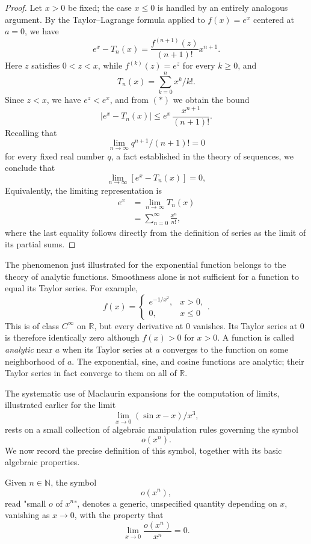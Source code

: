 \begin{proof}
Let $x > 0$ be fixed; the case $x \leq 0$ is handled by an entirely analogous argument. By the Taylor--Lagrange formula applied to $f(x) = e^x$ centered at $a = 0$, we have
\begin{equation*}
e^x - T_n(x) = \frac{f^{(n+1)}(z)}{(n+1)!} x^{n+1}. \tag{$*$}
\end{equation*}
Here $z$ satisfies $0 < z < x$, while $f^{(k)}(z) = e^z$ for every $k \geq 0$, and
\[
T_n(x) = \sum_{k=0}^{n} x^k / k!.
\]
Since $z < x$, we have $e^z < e^x$, and from $(*)$ we obtain the bound
\[
|e^x - T_n(x)| \leq e^x \, \frac{x^{n+1}}{(n+1)!}.
\]
Recalling that \[
\lim_{n \to \infty} q^{n+1}/(n+1)! = 0
\] for every fixed real number $q$, a fact established in the theory of sequences, we conclude that
\[
\lim_{n \to \infty} [e^x - T_n(x)] = 0,
\]
Equivalently, the limiting representation is
\[
\begin{aligned}
e^x &= \lim_{n \to \infty} T_n(x) \\
&= \sum_{n=0}^{\infty} \frac{x^n}{n!},
\end{aligned}
\]
where the last equality follows directly from the definition of series as the limit of its partial sums.
\end{proof}

The phenomenon just illustrated for the exponential function belongs to
the theory of analytic functions. Smoothness alone is not sufficient for a
function to equal its Taylor series. For example,
\[
f(x)=
\begin{cases}
e^{-1/x^2},&x>0,\\
0,&x\leq0
\end{cases}.
\]
This is of class $C^\infty$ on $\mathbb{R}$, but every derivative at $0$
vanishes. Its Taylor series at $0$ is therefore identically zero although
$f(x)>0$ for $x>0$. A function is called \emph{analytic} near $a$ when
its Taylor series at $a$ converges to the function on some neighborhood
of $a$. The exponential, sine, and cosine functions are analytic; their
Taylor series in fact converge to them on all of $\mathbb{R}$.

The systematic use of Maclaurin expansions for the computation of limits, illustrated earlier for the limit \[
\lim_{x \to 0} (\sin x - x)/x^3,
\] rests on a small collection of algebraic manipulation rules governing the symbol
\[
o(x^n).
\] We now record the precise definition of this symbol, together with its basic algebraic properties.

\begin{definition}
Given $n \in \mathbb{N}$, the symbol
\[
o(x^n),
\] read "small $o$ of $x^n$", denotes a generic, unspecified quantity depending on $x$, vanishing as $x \to 0$, with the property that
\[
\lim_{x \to 0} \frac{o(x^n)}{x^n} = 0.
\]

\end{definition}

